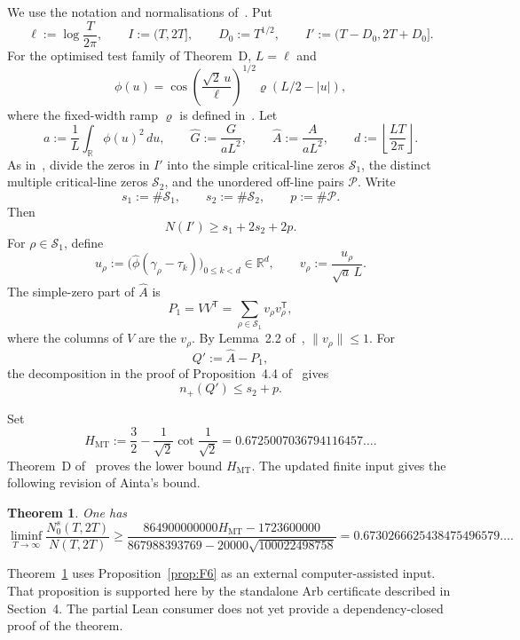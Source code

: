 \documentclass[11pt]{article}
\newtheorem{theorem}{Theorem}[section]
\newcommand{\R}{\mathbb R}
\newcommand{\cS}{\mathcal S}
\newcommand{\cP}{\mathcal P}
\begin{document}
We use the notation and normalisations of~\cite[\S\S2,4,7.1]{Claude26}.  Put
\[
 \ell:=\log\frac{T}{2\pi},\qquad I:=(T,2T],\qquad
 D_0:=T^{1/2},\qquad I':=(T-D_0,2T+D_0].
\]
For the optimised test family of Theorem~D, $L=\ell$ and
\[
 \phi(u)=\cos\!\left(\frac{\sqrt2\,u}{\ell}\right)^{1/2}
 \varrho(L/2-|u|),
\]
where the fixed-width ramp $\varrho$ is defined in~\cite[\S2.2]{Claude26}.
Let
\[
 a:=\frac1L\int_{\R}\phi(u)^2\,du,
 \qquad \widehat G:=\frac{G}{aL^2},
 \qquad \widehat A:=\frac{A}{aL^2},
 \qquad d:=\left\lfloor\frac{LT}{2\pi}\right\rfloor.
\]
As in~\cite[\S4.1]{Claude26}, divide the zeros in $I'$ into the simple
critical-line zeros $\cS_1$, the distinct multiple critical-line zeros
$\cS_2$, and the unordered off-line pairs $\cP$.  Write
\[
 s_1:=\#\cS_1,\qquad s_2:=\#\cS_2,\qquad p:=\#\cP.
\]
Then
\begin{equation}\label{eq:Nlower}
 N(I')\ge s_1+2s_2+2p.
\end{equation}
For $\rho\in\cS_1$, define
\[
 u_\rho:=\bigl(\widehat\phi(\gamma_\rho-\tau_k)\bigr)_{0\le k<d}
 \in\R^d,
 \qquad
 v_\rho:=\frac{u_\rho}{\sqrt a\,L}.
\]
The simple-zero part of $\widehat A$ is
\[
 P_1=VV^{\mathsf T}=\sum_{\rho\in\cS_1}v_\rho v_\rho^{\mathsf T},
\]
where the columns of $V$ are the $v_\rho$.  By Lemma~2.2
of~\cite{Claude26}, $\|v_\rho\|\le1$.  For
\[
 Q':=\widehat A-P_1,
\]
the decomposition in the proof of Proposition~4.4 of~\cite{Claude26} gives
\begin{equation}\label{eq:index}
 n_+(Q')\le s_2+p.
\end{equation}

Set
\[
 H_{\mathrm{MT}}
 :=\frac32-\frac1{\sqrt2}\cot\frac1{\sqrt2}
 =0.6725007036794116457\ldots .
\]
Theorem~D of~\cite{Claude26} proves the lower bound $H_{\mathrm{MT}}$.
The updated finite input gives the following revision of Ainta's bound.

\begin{theorem}\label{thm:main}
One has
\[
 \liminf_{T\to\infty}
 \frac{N_0^s(T,2T)}{N(T,2T)}
 \ge
 \frac{864900000000H_{\mathrm{MT}}-1723600000}
 {867988393769-20000\sqrt{100022498758}}
 =0.6730266625438475496579\ldots .
\]
\end{theorem}

Theorem~\ref{thm:main} uses Proposition~\ref{prop:F6} as an external
computer-assisted input.  That proposition is supported here by the
standalone Arb certificate described in Section~4.  The partial Lean consumer
does not yet provide a dependency-closed proof of the theorem.

\clearpage
\end{document}
